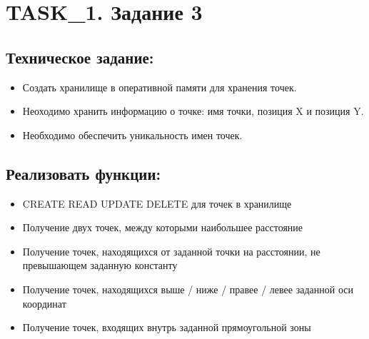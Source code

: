 \chapter{TASK\_1. Задание 3}

\section{Техническое задание:}

\begin{itemize}
	\item Создать хранилище в оперативной памяти для хранения точек.
	\item Неоходимо хранить информацию о точке: имя точки, позиция X и позиция Y.
	\item Необходимо обеспечить уникальность имен точек.
\end{itemize}

\section{Реализовать функции:}

\begin{itemize}
	\item CREATE READ UPDATE DELETE для точек в хранилище
	\item Получение двух точек, между которыми наибольшее расстояние
	\item Получение точек, находящихся от заданной точки на расстоянии, не превышающем заданную константу
	\item Получение точек, находящихся выше / ниже / правее / левее заданной оси координат
	\item Получение точек, входящих внутрь заданной прямоугольной зоны
\end{itemize}


